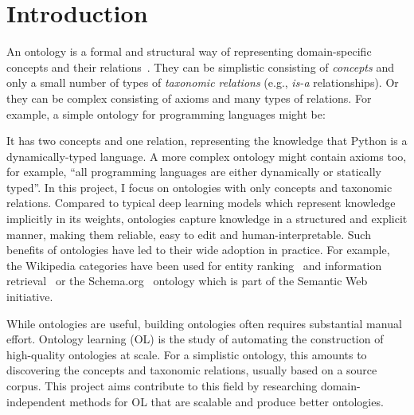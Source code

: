\chapter{Introduction}

\label{firstcontentpage} %

An ontology is a formal and structural way of representing domain-specific concepts and their relations~\cite{gruber1995toward}.
They can be simplistic consisting of \emph{concepts} and only a small number of types of \emph{taxonomic relations} (e.g., \emph{is-a} relationships). Or they can be complex consisting of axioms and many types of relations. For example, a simple ontology for programming languages might be:
\begin{figure}[H]
    \centering
\end{figure}
\vspace{-1em}
It has two concepts and one relation, representing the knowledge that Python is a dynam\-ically-typed language. A more complex ontology might contain axioms too, for example, ``all programming languages are either dynamically or statically typed''. In this project, I focus on ontologies with only concepts and taxonomic relations. Compared to typical deep learning models which represent knowledge implicitly in its weights, ontologies capture knowledge in a structured and explicit manner, making them reliable, easy to edit and human-interpretable. Such benefits of ontologies have led to their wide adoption in practice. For example, the Wikipedia categories have been used for entity ranking~\cite{vercoustre2008using} and information retrieval~\cite{sorg2012exploiting} or the Schema.org~\cite{Schema.org_2011} ontology which is part of the Semantic Web~\cite{antoniou2004semantic} initiative.

While ontologies are useful, building ontologies often requires substantial manual effort. Ontology learning (OL) is the study of automating the construction of high-quality ontologies at scale. For a simplistic ontology, this amounts to discovering the concepts and taxonomic relations, usually based on a source corpus. This project aims contribute to this field by researching domain-independent methods for OL that are scalable and produce better ontologies.

